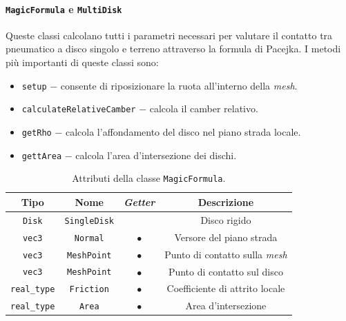 \paragraph{\texttt{MagicFormula} e \texttt{MultiDisk}}
Queste classi calcolano tutti i parametri necessari per valutare il contatto tra pneumatico a disco singolo e terreno attraverso la formula di Pacejka. I metodi più importanti di queste classi sono:
\begin{itemize}
	\item \texttt{setup} $-$ consente di riposizionare la ruota all'interno della \textit{mesh}.
	\item \texttt{calculateRelativeCamber} $-$ calcola il camber relativo.
	\item \texttt{getRho} $-$ calcola l'affondamento del disco nel piano strada locale.
	\item \texttt{gettArea} $-$ calcola l'area d'intersezione dei dischi.
\end{itemize}
\begin{table}[h!]
	\centering
	\begin{tabular}{|c|c|c|c|}
		\hline 
		\textbf{Tipo} & \textbf{Nome} & \textit{\textbf{Getter}} & \textbf{Descrizione} \\ \hline 
		\texttt{Disk} & \texttt{SingleDisk} &  & Disco rigido \\ \hline 
		\texttt{vec3} & \texttt{Normal} & $\bullet$ & Versore del piano strada \\ \hline
		\texttt{vec3} & \texttt{MeshPoint} & $\bullet$ & Punto di contatto sulla \textit{mesh} \\ \hline
		\texttt{vec3} & \texttt{MeshPoint} & $\bullet$ & Punto di contatto sul disco \\ \hline
		\texttt{real\_type} & \texttt{Friction} & $\bullet$ & Coefficiente di attrito locale \\ \hline
		\texttt{real\_type} & \texttt{Area} & $\bullet$ & Area d'intersezione \\ \hline
	\end{tabular}
	\caption{Attributi della classe \texttt{MagicFormula}.}
	\label{}
\end{table}
%
